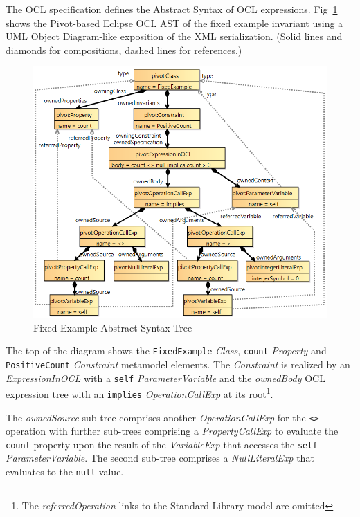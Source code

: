 \documentclass{llncs}
\begin{document}
The OCL specification defines the Abstract Syntax of OCL expressions. Fig~\ref{fig:FixedExampleAST} shows the Pivot-based Eclipse OCL AST of the fixed example invariant using a UML Object Diagram-like exposition of the XML serialization. (Solid lines and diamonds for compositions, dashed lines for references.)

\begin{figure}
	\vspace{-10pt}
	\begin{center}
		\includegraphics[width=4.5in]{FixedExampleAST.png}
	\end{center}
	\vspace{-10pt}
	\caption{Fixed Example Abstract Syntax Tree}
	\label{fig:FixedExampleAST}
	\vspace{-10pt}
\end{figure}

The top of the diagram shows the \verb|FixedExample| \emph{Class}, \verb|count| \emph{Property} and \verb|PositiveCount| \emph{Constraint} metamodel elements. The \emph{Constraint} is realized by an \emph{ExpressionInOCL} with a \verb|self| \emph{ParameterVariable} and the \emph{ownedBody} OCL expression tree with an \verb|implies| \emph{OperationCallExp} at its root\footnote{The \emph{referredOperation} links to the Standard Library model are omitted}.

The \emph{ownedSource} sub-tree comprises another \emph{OperationCallExp} for the \verb|<>| operation with further sub-trees comprising a \emph{PropertyCallExp} to evaluate the \verb|count| property upon the result of the \emph{VariableExp} that accesses the \verb|self| \emph{ParameterVariable}. The second sub-tree comprises a \emph{NullLiteralExp} that evaluates to the \verb|null| value.
\end{document}

